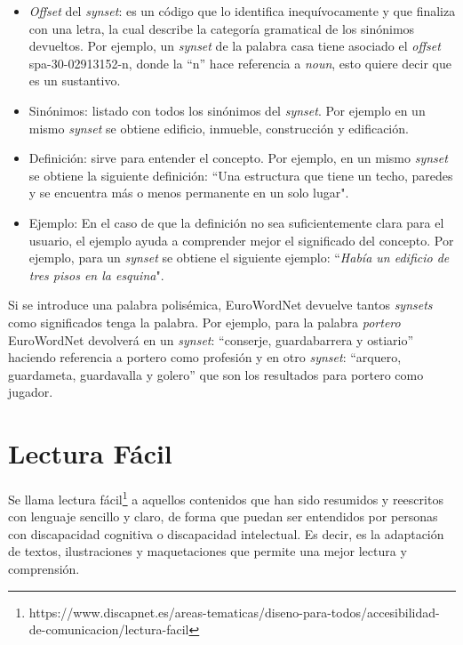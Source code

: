 

\begin{itemize}
	
	\item \textit{Offset} del \textit{synset}: es un código que lo identifica inequívocamente y que finaliza con una letra, la cual describe la categoría gramatical de los sinónimos devueltos. Por ejemplo, un \textit{synset} de la palabra casa tiene asociado el \textit{offset} spa-30-02913152-n, donde la ``n'' hace referencia a \textit{noun}, esto quiere decir que es un sustantivo. 
	\item Sinónimos: listado con todos los sinónimos del \textit{synset}. Por ejemplo en un mismo \textit{synset} se obtiene edificio, inmueble, construcción y edificación.
	\item Definición: sirve para entender el concepto. Por ejemplo, en un mismo \textit{synset} se obtiene la siguiente definición: ``Una estructura que tiene un techo, paredes y se encuentra más o menos permanente en un solo lugar".
	\item Ejemplo: En el caso de que la definición no sea suficientemente clara para el usuario, el ejemplo ayuda a comprender mejor el significado del concepto. Por ejemplo, para un \textit{synset} se obtiene el siguiente ejemplo: ``\textit{Había un edificio de tres pisos en la esquina}". 
\end{itemize} 

Si se introduce una palabra polisémica, EuroWordNet devuelve tantos \textit{synsets} como significados tenga la palabra.
Por ejemplo, para la palabra \textit{portero} EuroWordNet devolverá en un \textit{synset}: ``conserje, guardabarrera y ostiario'' haciendo referencia a portero como profesión y en otro \textit{synset}: ``arquero, guardameta, guardavalla y golero'' que son los resultados para portero como jugador. 



\section{Lectura Fácil}
\label{cap:sec:lecturafacil}

Se llama lectura fácil\footnote{https://www.discapnet.es/areas-tematicas/diseno-para-todos/accesibilidad-de-comunicacion/lectura-facil} a aquellos contenidos que han sido resumidos y reescritos con lenguaje sencillo y claro, de forma que puedan ser entendidos por personas con discapacidad cognitiva o discapacidad intelectual. Es decir, es la adaptación de textos, ilustraciones y maquetaciones que permite una mejor lectura y comprensión.


